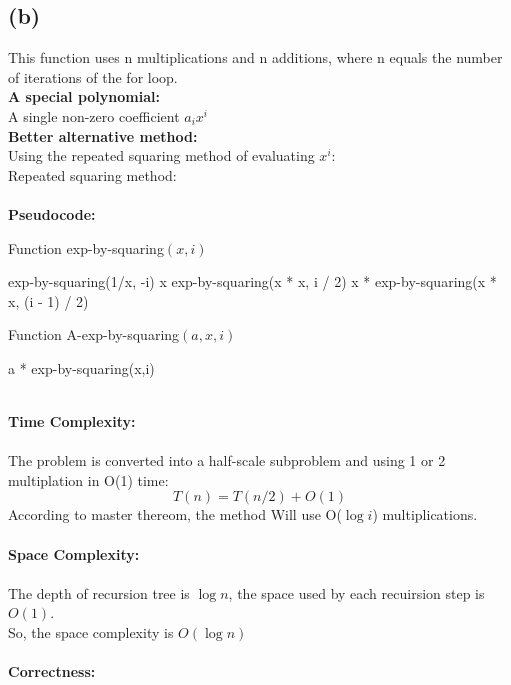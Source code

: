 \documentclass{article}
\begin{document}
\subsection{(b)}
This function uses n multiplications and n additions, where n equals the number of iterations of the for loop.\\
\textbf{A special polynomial:}\\
A single non-zero coefficient $a_ix^i$\\
\textbf{Better alternative method:}\\
Using the repeated squaring method of evaluating $x^i$:\\
Repeated squaring method:\\\\
\textbf{\large Pseudocode:}
\begin{algorithm}
  \caption{Function exp-by-squaring$(x,i)$}
  \label{alg1}
  \begin{algorithmic}
  \RETURN exp-by-squaring(1/x, -i)
  \RETURN x
  \RETURN exp-by-squaring(x * x,  i / 2)
  \RETURN x * exp-by-squaring(x * x, (i - 1) / 2)
  \ENDIF
  \end{algorithmic}
\end{algorithm}
\begin{algorithm}
  \caption{Function A-exp-by-squaring$(a,x,i)$}
  \label{alg1}
  \begin{algorithmic}
  \RETURN  a * exp-by-squaring(x,i)
  \end{algorithmic}
\end{algorithm}\\
\textbf{\large Time Complexity:}\\\\
The problem is converted into a half-scale subproblem and using 1 or 2 multiplation in O(1) time:\\
$$T(n)=T(n/2) + O(1)$$
According to master thereom, the method Will use O($\log i$) multiplications.\\\\
\textbf{\large Space Complexity:}\\\\
The depth of recursion tree is $\log n$, the space used by each recuirsion step is $O(1)$.\\
So, the space complexity is $O(\log n)$\\\\
\textbf{\large Correctness:}\\\\
\end{document}
